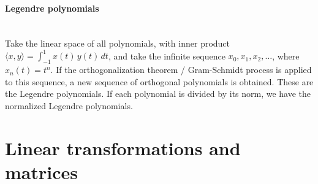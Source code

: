 \documentclass[10pt]{article}
\begin{document}
\paragraph{Legendre polynomials}\ \\
Take the linear space of all polynomials, with inner product $\langle x, y \rangle = \int_{-1}^1 x(t)\, y(t)\, dt$,
and take the infinite sequence $x_0, x_1, x_2, \dotsc$, where $x_n(t) = t^n$.  If the orthogonalization theorem / 
Gram-Schmidt process is applied to this sequence, a new sequence of orthogonal polynomials is obtained. These
are the Legendre polynomials.  If each polynomial is divided by its norm, we have the normalized Legendre polynomials.



\bigskip\bigskip
\section{Linear transformations and matrices}\smallskip
\end{document}
